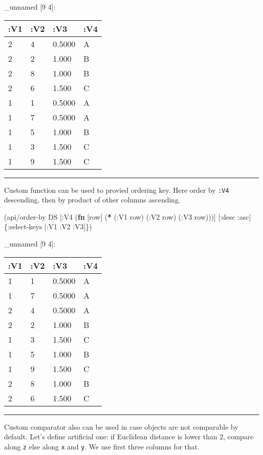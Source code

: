 \documentclass[]{article}
\newenvironment{Shaded}{\begin{snugshade}}{\end{snugshade}}
\newcommand{\KeywordTok}[1]{\textcolor[rgb]{0.13,0.29,0.53}{\textbf{#1}}}
\newcommand{\AttributeTok}[1]{\textcolor[rgb]{0.77,0.63,0.00}{#1}}
\newcommand{\NormalTok}[1]{#1}
\begin{document}
\_unnamed {[}9 4{]}:

\begin{longtable}[]{@{}llll@{}}
\toprule
:V1 & :V2 & :V3 & :V4\tabularnewline
\midrule
\endhead
2 & 4 & 0.5000 & A\tabularnewline
2 & 2 & 1.000 & B\tabularnewline
2 & 8 & 1.000 & B\tabularnewline
2 & 6 & 1.500 & C\tabularnewline
1 & 1 & 0.5000 & A\tabularnewline
1 & 7 & 0.5000 & A\tabularnewline
1 & 5 & 1.000 & B\tabularnewline
1 & 3 & 1.500 & C\tabularnewline
1 & 9 & 1.500 & C\tabularnewline
\bottomrule
\end{longtable}

\begin{center}\rule{0.5\linewidth}{0.5pt}\end{center}

Custom function can be used to provied ordering key. Here order by
\texttt{:V4} descending, then by product of other columns ascending.

\begin{Shaded}
\begin{Highlighting}[]
\NormalTok{(api/order-by DS [}\AttributeTok{:V4}\NormalTok{ (}\KeywordTok{fn}\NormalTok{ [row] (}\KeywordTok{*}\NormalTok{ (}\AttributeTok{:V1}\NormalTok{ row)}
\NormalTok{                                  (}\AttributeTok{:V2}\NormalTok{ row)}
\NormalTok{                                  (}\AttributeTok{:V3}\NormalTok{ row)))] [}\AttributeTok{:desc} \AttributeTok{:asc}\NormalTok{] \{}\AttributeTok{:select-keys}\NormalTok{ [}\AttributeTok{:V1} \AttributeTok{:V2} \AttributeTok{:V3}\NormalTok{]\})}
\end{Highlighting}
\end{Shaded}

\_unnamed {[}9 4{]}:

\begin{longtable}[]{@{}llll@{}}
\toprule
:V1 & :V2 & :V3 & :V4\tabularnewline
\midrule
\endhead
1 & 1 & 0.5000 & A\tabularnewline
1 & 7 & 0.5000 & A\tabularnewline
2 & 4 & 0.5000 & A\tabularnewline
2 & 2 & 1.000 & B\tabularnewline
1 & 3 & 1.500 & C\tabularnewline
1 & 5 & 1.000 & B\tabularnewline
1 & 9 & 1.500 & C\tabularnewline
2 & 8 & 1.000 & B\tabularnewline
2 & 6 & 1.500 & C\tabularnewline
\bottomrule
\end{longtable}

\begin{center}\rule{0.5\linewidth}{0.5pt}\end{center}

Custom comparator also can be used in case objects are not comparable by
default. Let's define artificial one: if Euclidean distance is lower
than 2, compare along \texttt{z} else along \texttt{x} and \texttt{y}.
We use first three columns for that.
\end{document}
